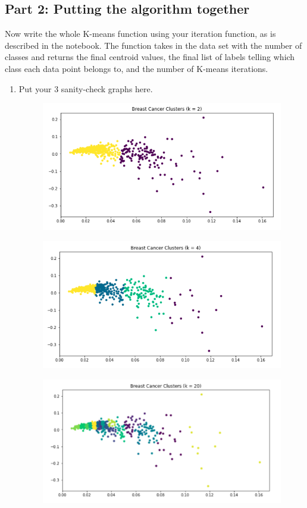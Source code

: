 \subsection{Part 2: Putting the algorithm together}
Now write the whole K-means function using your iteration function, as is described in the notebook. The function takes in the data set with the number of classes and returns the final centroid values, the final list of labels telling which class each data point belongs to, and the number of K-means iterations.
\begin{enumerate}
    \item Put your 3 sanity-check graphs here.
\begin{figure}[H]
    	\centering
    	\includegraphics[width=.7\textwidth]{templates/k2}
    	\label{fig:my_label}
    \end{figure}
\begin{figure}[H]
    	\centering
    	\includegraphics[width=.7\textwidth]{templates/k4}
    	\label{fig:my_label}
    \end{figure}
\begin{figure}[H]
    	\centering
    	\includegraphics[width=.7\textwidth]{templates/k20}
    	\label{fig:my_label}
    \end{figure}
    

\end{enumerate}

